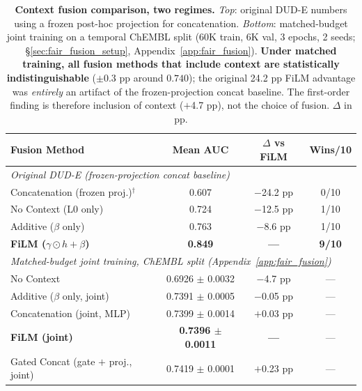\documentclass{article}
\begin{document}
\begin{table}[h]
\vspace{-2mm}
\caption{\textbf{Context fusion comparison, two regimes.} \textit{Top}: original DUD-E numbers using a frozen post-hoc projection for concatenation. \textit{Bottom}: matched-budget joint training on a temporal ChEMBL split (60K train, 6K val, 3 epochs, 2 seeds; \S\ref{sec:fair_fusion_setup}, Appendix~\ref{app:fair_fusion}). \textbf{Under matched training, all fusion methods that include context are statistically indistinguishable} ($\pm 0.3$ pp around $0.740$); the original 24.2 pp FiLM advantage was \emph{entirely} an artifact of the frozen-projection concat baseline. The first-order finding is therefore inclusion of context ($+$4.7 pp), not the choice of fusion. $\Delta$ in pp.}
\label{tab:fusion}
\centering
\small
\begin{tabular}{@{}lccc@{}}
\toprule
\textbf{Fusion Method} & \textbf{Mean AUC} & \textbf{$\Delta$ vs FiLM} & \textbf{Wins/10} \\
\midrule
\multicolumn{4}{l}{\textit{Original DUD-E (frozen-projection concat baseline)}} \\
Concatenation (frozen proj.)$^\dagger$ & 0.607 & $-$24.2 pp & 0/10 \\
No Context (L0 only) & 0.724 & $-$12.5 pp & 1/10 \\
Additive ($\beta$ only) & 0.763 & $-$8.6 pp & 1/10 \\
\textbf{FiLM ($\gamma \odot h + \beta$)} & \textbf{0.849} & \textbf{---} & \textbf{9/10} \\
\midrule
\multicolumn{4}{l}{\textit{Matched-budget joint training, ChEMBL split (Appendix~\ref{app:fair_fusion})}} \\
No Context & 0.6926 $\pm$ 0.0032 & $-$4.7 pp & --- \\
Additive ($\beta$ only, joint) & 0.7391 $\pm$ 0.0005 & $-$0.05 pp & --- \\
Concatenation (joint, MLP) & 0.7399 $\pm$ 0.0014 & $+$0.03 pp & --- \\
\textbf{FiLM (joint)} & \textbf{0.7396 $\pm$ 0.0011} & \textbf{---} & --- \\
Gated Concat (gate $+$ proj., joint) & 0.7419 $\pm$ 0.0001 & $+$0.23 pp & --- \\
\bottomrule
\end{tabular}
\vspace{-2mm}
\end{table}
\end{document}
